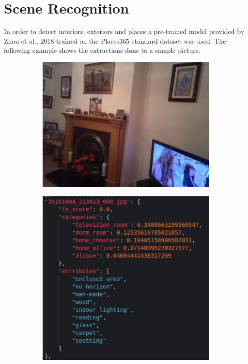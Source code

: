 \section{Scene Recognition}
\label{sec:scene_recognition}
  In order to detect interiors, exteriors and places a pre-trained model provided by Zhou et al., 2018 \cite{Zhou2018}  trained on the Places365 standard dataset was used. The following example shows the extractions done to a sample picture. 

  \begin{figure}[H]
    \centering
    \captionsetup{justification=centering}

    \begin{subfigure}{0.525\textwidth}
    
    \includegraphics[width=\textwidth]{Sections/4InitialWork/4_images_random/dataset_place.jpg} 
    \caption{}
    \end{subfigure}
    \begin{subfigure}{0.4\textwidth}
    \includegraphics[width=\textwidth]{Sections/4InitialWork/4_images_random/places_detect.png}
    \caption{}
    \end{subfigure}
    

\end{figure}
